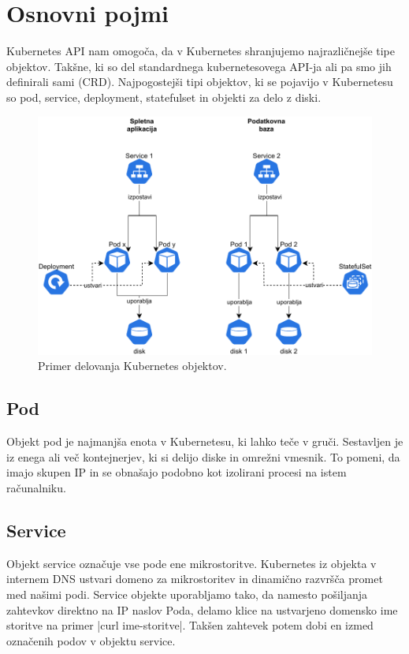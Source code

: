 \documentclass[a4paper, 12pt]{book}
\begin{document}
\section{Osnovni pojmi}
Kubernetes API nam omogoča, da v Kubernetes shranjujemo najrazličnejše tipe objektov.
Takšne, ki so del standardnega kubernetesovega API-ja ali pa smo jih definirali sami (CRD).
Najpogostejši tipi objektov, ki se pojavijo v Kubernetesu so pod, service, deployment, statefulset in objekti za delo z diski.
\begin{figure}[h]
\begin{center}
\includegraphics[width=1.0\textwidth]{images/Kubernetes-simple-schema.pdf}
\end{center}
\caption{Primer delovanja Kubernetes objektov.}
\label{problem-povezanih-clustrov}
\end{figure}
\subsection{Pod~\cite{pod}}
Objekt pod je najmanjša enota v Kubernetesu, ki lahko teče v gruči.
Sestavljen je iz enega ali več kontejnerjev, ki si delijo diske in omrežni vmesnik.
To pomeni, da imajo skupen IP in se obnašajo podobno kot izolirani procesi na istem računalniku.
\subsection{Service~\cite{service}}
Objekt service označuje vse pode ene mikrostoritve.
Kubernetes iz objekta v internem DNS ustvari domeno za mikrostoritev in dinamično razvršča promet med našimi podi.
Service objekte uporabljamo tako, da namesto pošiljanja zahtevkov direktno na IP naslov Poda, delamo klice na ustvarjeno domensko ime storitve na primer \spverb|curl ime-storitve|.
Takšen zahtevek potem dobi en izmed označenih podov v objektu service.
\end{document}
